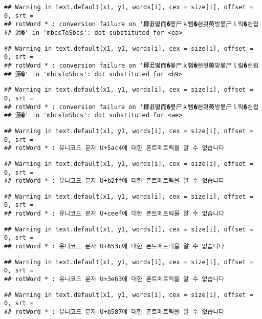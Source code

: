 \documentclass[]{article}
\begin{document}
\begin{verbatim}
## Warning in text.default(x1, y1, words[i], cex = size[i], offset = 0, srt =
## rotWord * : conversion failure on '椰꾨떯而�뵾尸ｋ뻼�쇈묏萸방뵾尸ｌ맄�쇈묍
## 源�' in 'mbcsToSbcs': dot substituted for <ea>
\end{verbatim}

\begin{verbatim}
## Warning in text.default(x1, y1, words[i], cex = size[i], offset = 0, srt =
## rotWord * : conversion failure on '椰꾨떯而�뵾尸ｋ뻼�쇈묏萸방뵾尸ｌ맄�쇈묍
## 源�' in 'mbcsToSbcs': dot substituted for <b9>
\end{verbatim}

\begin{verbatim}
## Warning in text.default(x1, y1, words[i], cex = size[i], offset = 0, srt =
## rotWord * : conversion failure on '椰꾨떯而�뵾尸ｋ뻼�쇈묏萸방뵾尸ｌ맄�쇈묍
## 源�' in 'mbcsToSbcs': dot substituted for <ae>
\end{verbatim}

\begin{verbatim}
## Warning in text.default(x1, y1, words[i], cex = size[i], offset = 0, srt =
## rotWord * : 유니코드 문자 U+5ac4에 대한 폰트메트릭을 알 수 없습니다
\end{verbatim}

\begin{verbatim}
## Warning in text.default(x1, y1, words[i], cex = size[i], offset = 0, srt =
## rotWord * : 유니코드 문자 U+b2ff에 대한 폰트메트릭을 알 수 없습니다
\end{verbatim}

\begin{verbatim}
## Warning in text.default(x1, y1, words[i], cex = size[i], offset = 0, srt =
## rotWord * : 유니코드 문자 U+ceef에 대한 폰트메트릭을 알 수 없습니다
\end{verbatim}

\begin{verbatim}
## Warning in text.default(x1, y1, words[i], cex = size[i], offset = 0, srt =
## rotWord * : 유니코드 문자 U+653c에 대한 폰트메트릭을 알 수 없습니다
\end{verbatim}

\begin{verbatim}
## Warning in text.default(x1, y1, words[i], cex = size[i], offset = 0, srt =
## rotWord * : 유니코드 문자 U+3e63에 대한 폰트메트릭을 알 수 없습니다
\end{verbatim}

\begin{verbatim}
## Warning in text.default(x1, y1, words[i], cex = size[i], offset = 0, srt =
## rotWord * : 유니코드 문자 U+b587에 대한 폰트메트릭을 알 수 없습니다
\end{verbatim}
\end{document}
